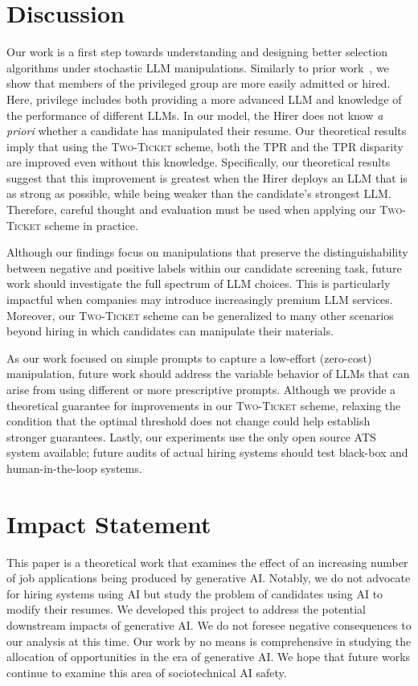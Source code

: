 \section{Discussion}
Our work is a first step towards understanding and designing better selection algorithms under stochastic LLM manipulations. Similarly to prior work~\citep{Hu19}, we show that members of the privileged group are more easily admitted or hired. Here, privilege includes both providing a more advanced LLM and knowledge of the performance of different LLMs. In our model, the Hirer does not know \textit{a priori} whether a candidate has manipulated their resume. Our theoretical results imply that using the \textsc{Two-Ticket} scheme, both the TPR and the TPR disparity are improved even without this knowledge. Specifically, our theoretical results suggest that this improvement is greatest when the Hirer deploys an LLM that is as strong as possible, while being weaker than the candidate's strongest LLM. Therefore, careful thought and evaluation must be used when applying our \textsc{Two-Ticket} scheme in practice. 

Although our findings focus on manipulations that preserve the distinguishability between negative and positive labels within our candidate screening task, future work should investigate the full spectrum of LLM choices. This is particularly impactful when companies may introduce increasingly premium LLM services. Moreover, our \textsc{Two-Ticket} scheme can be generalized to many other scenarios beyond hiring in which candidates can manipulate their materials. 

As our work focused on simple prompts to capture a low-effort (zero-cost) manipulation, future work should address the variable behavior of LLMs that can arise from using different or more prescriptive prompts. Although we provide a theoretical guarantee for improvements in our \textsc{Two-Ticket} scheme, relaxing the condition that the optimal threshold does not change could help establish stronger guarantees. Lastly, our experiments use the only open source ATS system available; future audits of actual hiring systems should test black-box and human-in-the-loop systems. 

\section{Impact Statement}
This paper is a theoretical work that examines the effect of an increasing number of job applications being produced by generative AI. Notably, we do not advocate for hiring systems using AI but study the problem of candidates using AI to modify their resumes. We developed this project to address the potential downstream impacts of generative AI. We do not foresee negative consequences to our analysis at this time. Our work by no means is comprehensive in studying the allocation of opportunities in the era of generative AI. We hope that future works continue to examine this area of sociotechnical AI safety. 